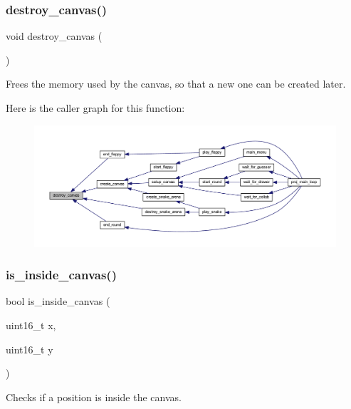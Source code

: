 \subsubsection{\texorpdfstring{destroy\+\_\+canvas()}{destroy\_canvas()}}
{\footnotesize\ttfamily void destroy\+\_\+canvas (\begin{DoxyParamCaption}{ }\end{DoxyParamCaption})}



Frees the memory used by the canvas, so that a new one can be created later. 

Here is the caller graph for this function\+:\nopagebreak
\begin{figure}[H]
\begin{center}
\leavevmode
\includegraphics[width=350pt]{group__canvas_ga1574bd14271b62f79a866c5b961ea41a_icgraph}
\end{center}
\end{figure}
\mbox{\label{group__canvas_ga85fca0492c1f7ec8e1d20a9b5e48be1c}} 
\subsubsection{\texorpdfstring{is\+\_\+inside\+\_\+canvas()}{is\_inside\_canvas()}}
{\footnotesize\ttfamily bool is\+\_\+inside\+\_\+canvas (\begin{DoxyParamCaption}\item[{uint16\+\_\+t}]{x,  }\item[{uint16\+\_\+t}]{y }\end{DoxyParamCaption})}



Checks if a position is inside the canvas. 


